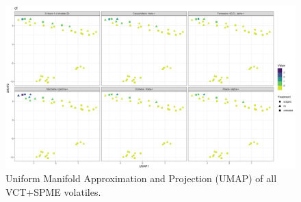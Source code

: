 \documentclass[12pt,final,CPage]{ufthesis}
\begin{document}
{\begin{figure}
  {\centering \includegraphics[width=1\linewidth]{figure/rrv_volatiles_umap_chems_df} 

  }

  \caption{Uniform Manifold Approximation and Projection (UMAP) of all VCT+SPME volatiles.}\label{fig:all-vocs-umap}
  \end{figure}
  \begin{table}


\end{table}}
\end{document}
